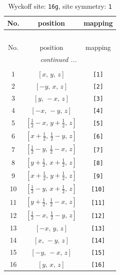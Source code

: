 \documentclass[fleqn,8pt]{jsarticle}
\begin{document}
\begin{longtable}{ccc}
\caption{Wyckoff site: {\tt 16g}, site symmetry: {\tt 1}}
 \\
 \hline \hline
No. & position & mapping \\ \hline \endfirsthead

\multicolumn{2}{l}{\tablename\ \thetable{}} \\
 \hline \hline
No. & position & mapping \\ \hline \endhead

 \hline \hline
\multicolumn{2}{r}{\footnotesize\it continued ...} \\ \endfoot

 \hline \hline
\multicolumn{2}{r}{} \\ \endlastfoot

1 & $\left[ x,\, y,\, z \right]$ & {\tt [1]} \\ \hline
2 & $\left[ - y,\, x,\, z \right]$ & {\tt [2]} \\ \hline
3 & $\left[ y,\, - x,\, z \right]$ & {\tt [3]} \\ \hline
4 & $\left[ - x,\, - y,\, z \right]$ & {\tt [4]} \\ \hline
5 & $\left[ \frac{1}{2} - x,\, y + \frac{1}{2},\, z \right]$ & {\tt [5]} \\ \hline
6 & $\left[ x + \frac{1}{2},\, \frac{1}{2} - y,\, z \right]$ & {\tt [6]} \\ \hline
7 & $\left[ \frac{1}{2} - y,\, \frac{1}{2} - x,\, z \right]$ & {\tt [7]} \\ \hline
8 & $\left[ y + \frac{1}{2},\, x + \frac{1}{2},\, z \right]$ & {\tt [8]} \\ \hline
9 & $\left[ x + \frac{1}{2},\, y + \frac{1}{2},\, z \right]$ & {\tt [9]} \\ \hline
10 & $\left[ \frac{1}{2} - y,\, x + \frac{1}{2},\, z \right]$ & {\tt [10]} \\ \hline
11 & $\left[ y + \frac{1}{2},\, \frac{1}{2} - x,\, z \right]$ & {\tt [11]} \\ \hline
12 & $\left[ \frac{1}{2} - x,\, \frac{1}{2} - y,\, z \right]$ & {\tt [12]} \\ \hline
13 & $\left[ - x,\, y,\, z \right]$ & {\tt [13]} \\ \hline
14 & $\left[ x,\, - y,\, z \right]$ & {\tt [14]} \\ \hline
15 & $\left[ - y,\, - x,\, z \right]$ & {\tt [15]} \\ \hline
16 & $\left[ y,\, x,\, z \right]$ & {\tt [16]} \\
\end{longtable}
\end{document}
